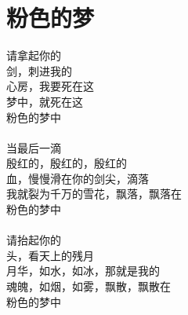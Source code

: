 \chapter{粉色的梦}

\leftskip=20mm
\noindent
请拿起你的 \\
剑，刺进我的\\
心房，我要死在这\\
梦中，就死在这\\
粉色的梦中\\
\\
当最后一滴\\
殷红的，殷红的，殷红的\\
血，慢慢滑在你的剑尖，滴落\\
我就裂为千万的雪花，飘落，飘落在\\
粉色的梦中\\
\\
请抬起你的\\
头，看天上的残月\\
月华，如水，如冰，那就是我的\\
魂魄，如烟，如雾，飘散，飘散在\\
粉色的梦中
